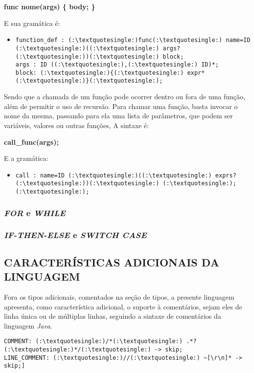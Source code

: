             \textbf{func nome(args) \{
                body;
            \}}

            E sua gramática é:
            \begin{itemize}
            \item[ ]
            \begin{lstlisting}
function_def : (:\textquotesingle:)func(:\textquotesingle:) name=ID (:\textquotesingle:)((:\textquotesingle:) args? (:\textquotesingle:))(:\textquotesingle:) block;
args : ID ((:\textquotesingle:),(:\textquotesingle:) ID)*;
block: (:\textquotesingle:){(:\textquotesingle:) expr* (:\textquotesingle:)}(:\textquotesingle:);            
            \end{lstlisting}
            \end{itemize}

            Sendo que a chamada de um função pode ocorrer dentro ou fora de uma função, além de permitir o uso de recursão. Para chamar uma função, basta invocar o nome da mesma, passando para ela uma lista de parâmetros, que podem ser variáveis, valores ou outras funções, A sintaxe é:

            \textbf{call\_func(args);}

            E a gramática:
			\begin{itemize}
				\item[ ]
				
    			   \begin{lstlisting}
call : name=ID (:\textquotesingle:)((:\textquotesingle:) exprs? (:\textquotesingle:))(:\textquotesingle:) (:\textquotesingle:);(:\textquotesingle:);            
	           \end{lstlisting}

			\end{itemize}
        
        \subsubsection{\normalsize \textit{FOR} e \textit{WHILE}}

        \subsubsection{\normalsize \textit{IF-THEN-ELSE} e \textit{SWITCH CASE}}

	\subsection{\normalsize CARACTERÍSTICAS ADICIONAIS DA LINGUAGEM}
            Fora os tipos adicionais, comentados na seção de tipos, a presente linguagem apresenta, como característica adicional, o suporte à comentários, sejam eles de linha única ou de múltiplas linhas, seguindo a sintaxe de comentários da linguagem \textit{Java}.

            \begin{lstlisting}
COMMENT: (:\textquotesingle:)/*(:\textquotesingle:) .*? (:\textquotesingle:)*/(:\textquotesingle:) -> skip;
LINE_COMMENT: (:\textquotesingle:)//(:\textquotesingle:) ~[\r\n]* -> skip;]
            \end{lstlisting}
